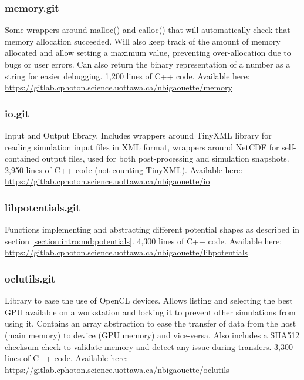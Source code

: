 \subsubsection{memory.git} \label{section:tools:libraries:memory}

Some wrappers around malloc() and calloc() that will automatically check that
memory allocation succeeded. Will also keep track of the amount of
memory allocated and allow setting a maximum value, preventing
over-allocation due to bugs or user errors. Can also return the binary
representation of a number as a string for easier debugging. 1,200 lines of
C++ code. Available here:\\
\url{https://gitlab.cphoton.science.uottawa.ca/nbigaouette/memory}


\subsubsection{io.git} \label{section:tools:libraries:io}

Input and Output library. Includes wrappers around TinyXML library\cite{tinyxml}
for reading simulation input files in XML format,
wrappers around NetCDF\cite{netcdf} for self-contained
output files, used for both post-processing and simulation snapshots.
2,950 lines of C++ code (not counting TinyXML). Available here:\\
\url{https://gitlab.cphoton.science.uottawa.ca/nbigaouette/io}


\subsubsection{libpotentials.git} \label{section:tools:libraries:libpotentials}

Functions implementing and abstracting different potential shapes as
described in section \ref{section:intro:md:potentials}. 4,300 lines of C++ code.
Available here:\\
\url{https://gitlab.cphoton.science.uottawa.ca/nbigaouette/libpotentials}


\subsubsection{oclutils.git} \label{section:tools:libraries:oclutils}

Library to ease the use of OpenCL devices. Allows listing and selecting the
best GPU available on a workstation and locking it to prevent
other simulations from using it. Contains an array abstraction to ease the
transfer of data from the host (main memory) to device (GPU memory) and
vice-versa. Also includes a SHA512 checksum check to validate memory
and detect any issue during transfers. 3,300 lines of C++ code.
Available here:
\url{https://gitlab.cphoton.science.uottawa.ca/nbigaouette/oclutils}


